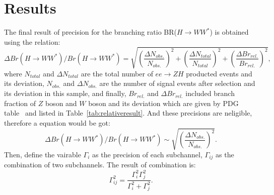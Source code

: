 \documentclass[11pt,a4paper]{cepcnote}
\begin{document}
\section{Results}
The final result of precision for the branching ratio BR($H\rightarrow WW^*$) is 
obtained using the relation: 
\begin{equation*}
\Delta{Br(H\rightarrow WW^*)}/Br(H\rightarrow WW^*) = 
\sqrt{(\frac{\Delta N_{obs.}}{N_{obs.}})^2
		+(\frac{\Delta N_{total}}{N_{total}})^2
	+(\frac{\Delta Br_{rel.}}{Br_{rel.}})^2},
\end{equation*}
where $N_{total}$ and $\Delta N_{total}$ are the total number of $ee\to ZH$ producted events and its deviation,
$N_{obs.}$ and $\Delta N_{obs.}$ are the number of signal events after selection and its deviation in this sample,
and finally, $Br_{rel.}$ and $\Delta Br_{rel.}$ included branch fraction of $Z$ boson and $W$ boson and its deviation
which are given by PDG table~\cite{Agashe:2014kda} and listed in Table~\ref{tab:relativeresult}. And these precisions are neligible, 
therefore a equation would be got:
\begin{equation}
	\Delta{Br(H\rightarrow WW^*)}/Br(H\rightarrow WW^*) \sim \sqrt{(\frac{\Delta N_{obs.}}{N_{obs.}})^2}.
	\label{equ:one}
\end{equation}
Then, define the vairable $\Gamma_i$ as the precision of each subchannel, $\Gamma_{ij}$ as the combination of two subchannels. 
The result of combination is:
\begin{equation}
	\Gamma_{ij}^2 = \frac{\Gamma_i^2\Gamma_j^2}{\Gamma_i^2+\Gamma_j^2}.
	\label{equ:two}
\end{equation}
\end{document}

